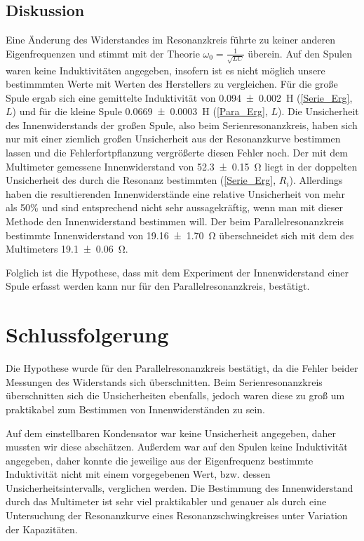 \documentclass[
	a4paper,
	12pt,
	pagesize,
	ngerman
]{scrartcl}
\begin{document}
	\subsection{Diskussion}
	Eine Änderung des Widerstandes im Resonanzkreis führte zu keiner anderen Eigenfrequenzen und stimmt mit der Theorie $\omega_0 = \frac{1}{\sqrt{LC}}$ überein. %
	Auf den Spulen waren keine Induktivitäten angegeben, insofern ist es nicht möglich unsere bestimmmten Werte mit Werten des Herstellers zu vergleichen.
	Für die große Spule ergab sich eine gemittelte Induktivität von \SI{0,094 \pm 0,002}{H} (\cref{Serie_Erg}, $L$) und für die kleine Spule \SI{0,0669 \pm 0,0003}{H} (\cref{Para_Erg}, $L$).
	Die Unsicherheit des Innenwiderstands der großen Spule, also beim Serienresonanzkreis, haben sich nur mit einer ziemlich großen Unsicherheit aus der Resonanzkurve bestimmen lassen und die Fehlerfortpflanzung vergrößerte diesen Fehler noch.
	Der mit dem Multimeter gemessene Innenwiderstand von \SI{52,3 \pm 0,15}{\ohm} liegt in der doppelten Unsicherheit des durch die Resonanz bestimmten (\cref{Serie_Erg}, $R_i$).
	Allerdings haben die resultierenden Innenwiderstände eine relative Unsicherheit von mehr als 50\% und sind entsprechend nicht sehr aussagekräftig, wenn man mit dieser Methode den Innenwiderstand bestimmen will.
	Der beim Parallelresonanzkreis bestimmte Innenwiderstand von \SI{19.16\pm1,70}{\ohm} überschneidet sich mit dem des Multimeters \SI{19,1 \pm 0,06}{\ohm}.

	Folglich ist die Hypothese, dass mit dem Experiment der Innenwiderstand einer Spule erfasst werden kann nur für den Parallelresonanzkreis, bestätigt.
	
	\section{Schlussfolgerung}
	Die Hypothese wurde für den Parallelresonanzkreis bestätigt, da die Fehler beider Messungen des Widerstands sich überschnitten.
	Beim Serienresonanzkreis überschnitten sich die Unsicherheiten ebenfalls, jedoch waren diese zu groß um praktikabel zum Bestimmen von Innenwiderständen zu sein.

	Auf dem einstellbaren Kondensator war keine Unsicherheit angegeben, daher mussten wir diese abschätzen.
	Außerdem war auf den Spulen keine Induktivität angegeben, daher konnte die jeweilige aus der Eigenfrequenz bestimmte Induktivität nicht mit einem vorgegebenen Wert, bzw. dessen Unsicherheitsintervalls, verglichen werden.
	Die Bestimmung des Innenwiderstand durch das Multimeter ist sehr viel praktikabler und genauer als durch eine Untersuchung der Resonanzkurve eines Resonanzschwingkreises unter Variation der Kapazitäten.
\end{document}
